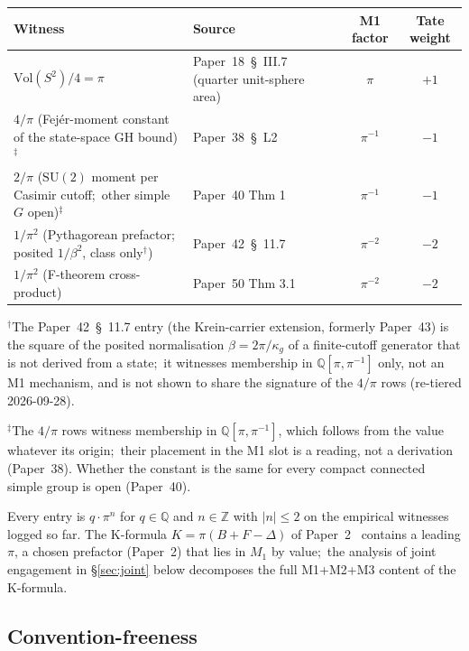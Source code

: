 \documentclass[11pt,a4paper]{article}
\theoremstyle{plain}
\theoremstyle{definition}
\newcommand{\Z}{\mathbb{Z}}
\newcommand{\Q}{\mathbb{Q}}
\newcommand{\Vol}{\mathrm{Vol}}
\begin{document}
\begin{center}
\begin{tabular}{@{}llcc@{}}
\toprule
Witness & Source & M1 factor & Tate weight \\
\midrule
$\Vol(S^2)/4 = \pi$ & Paper~18~\S~III.7~\cite{loutey_paper18} (quarter unit-sphere area) & $\pi$ & $+1$ \\
$4/\pi$ (Fej\'er-moment constant of the state-space GH bound)$^{\ddagger}$ & Paper~38~\S~L2~\cite{loutey_paper38} & $\pi^{-1}$ & $-1$ \\
$2/\pi$ ($\mathrm{SU}(2)$ moment per Casimir cutoff;\ other simple $G$ open)$^{\ddagger}$ & Paper~40 Thm 1~\cite{loutey_paper40} & $\pi^{-1}$ & $-1$ \\
$1/\pi^2$ (Pythagorean prefactor; posited $1/\beta^2$, class only$^{\dagger}$) & Paper~42~\S~11.7~\cite{loutey_paper42} & $\pi^{-2}$ & $-2$ \\
$1/\pi^2$ (F-theorem cross-product) & Paper~50 Thm 3.1~\cite{loutey_paper50} & $\pi^{-2}$ & $-2$ \\
\bottomrule
\end{tabular}
\end{center}

\noindent$^{\dagger}$The Paper~42~\S~11.7 entry (the Krein-carrier
extension, formerly Paper~43) is the square of the posited
normalisation $\beta = 2\pi/\kappa_g$ of a finite-cutoff generator that is
not derived from a state;\ it witnesses membership in $\Q[\pi,\pi^{-1}]$
only, not an M1 mechanism, and is not shown to share the signature of the
$4/\pi$ rows (re-tiered 2026-09-28).

\noindent$^{\ddagger}$The $4/\pi$ rows witness membership in
$\Q[\pi,\pi^{-1}]$, which follows from the value whatever its origin;\
their placement in the M1 slot is a reading, not a derivation
(Paper~38).  Whether the constant is the same for every compact
connected simple group is open (Paper~40).

Every entry is $q \cdot \pi^n$ for $q \in \Q$ and $n \in \Z$ with
$|n| \le 2$ on the empirical witnesses logged so far.  The K-formula
$K = \pi(B + F - \Delta)$ of Paper~2~\cite{loutey_paper2} contains a
leading $\pi$, a chosen prefactor (Paper~2) that lies in $M_1$ by value;\ the analysis of joint
engagement in \S\ref{sec:joint} below decomposes the full M1+M2+M3
content of the K-formula.

\subsection{Convention-freeness}
\end{document}
